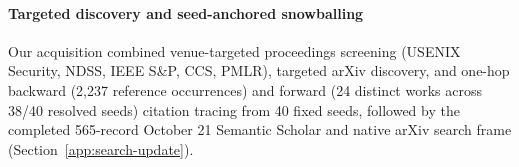 

\paragraph{Targeted discovery and seed-anchored snowballing}
Our acquisition combined venue-targeted proceedings screening (USENIX Security, NDSS, IEEE S\&P, CCS, PMLR), targeted arXiv discovery, and one-hop backward (2,237 reference occurrences) and forward (24 distinct works across 38/40 resolved seeds) citation tracing from 40 fixed seeds, followed by the completed 565-record October 21 Semantic Scholar and native arXiv search frame (Section~\ref{app:search-update}).
